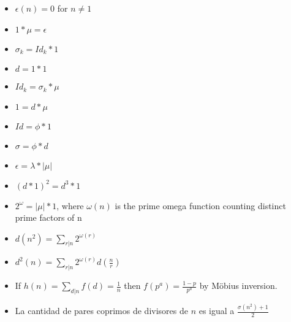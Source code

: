 {\normalsize
    \begin{itemize}
        \item $\epsilon(n) = 0$ for $n \neq 1$ 
        \item $1*\mu = \epsilon$
        \item $\sigma_k = Id_k*1$
        \item $d = 1 * 1$
        \item $Id_k = \sigma_k * \mu$
        \item $1 = d * \mu$
        \item $Id = \phi * 1$
        \item $\sigma = \phi * d$
        \item $\epsilon = \lambda*|\mu|$
        \item $(d*1)^2 = d^3*1$
        \item $2^\omega = |\mu|*1$, where ${\displaystyle \omega (n)}$ is the prime omega function counting distinct prime factors of n
        \item $\displaystyle d(n^2) = \sum_{r|n} 2^{\omega(r)}$ 
        \item $\displaystyle d^2(n) = \sum_{r|n} 2^{\omega(r)}d(\frac{n}{r})$ 
        \item If $h(n) = \sum_{d|n} f(d) = \frac{1}{n}$ then $f(p^a) = \frac{1-p}{p^a}$ by Möbius inversion.
        \item La cantidad de pares coprimos de divisores de $n$ es igual a $\frac{\sigma(n^2)+1}{2}$
    \end{itemize} 
}
